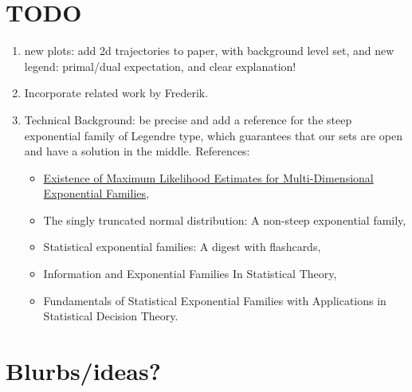 \documentclass[twoside]{article}
\begin{document}
	





\iffalse
\section{TODO}
\begin{enumerate}
	\item new plots: add 2d trajectories to paper, with background level set, and new legend: primal/dual expectation, and clear explanation!
	\item Incorporate related work by Frederik.
	\item Technical Background: be precise and add a reference for the steep exponential family of Legendre type, which guarantees that our sets are open and have a solution in the middle.
	References: \begin{itemize}
		\item \href{https://www.jstor.org/stable/4616462?seq=1#metadata_info_tab_contents}{Existence of Maximum Likelihood Estimates for Multi-Dimensional Exponential Families},
		\item The singly truncated normal distribution: A non-steep exponential family,
		\item Statistical exponential families: A digest with flashcards,
		\item Information and Exponential Families In Statistical Theory,
		\item Fundamentals of Statistical Exponential Families with Applications in Statistical Decision Theory.
	\end{itemize}
\end{enumerate}




\section{Blurbs/ideas?}
\end{document}
